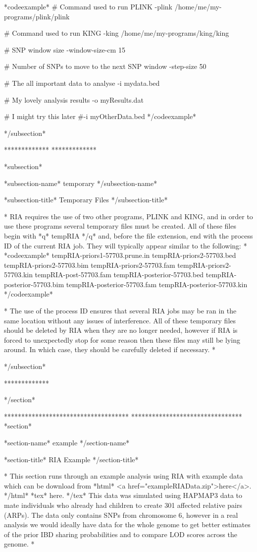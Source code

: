 *codeexample*
# Command used to run PLINK
-plink /home/me/my-programs/plink/plink

# Command used to run KING
-king /home/me/my-programs/king/king

# SNP window size
-window-size-cm 15

# Number of SNPs to move to the next SNP window
-step-size 50

# The all important data to analyse
-i mydata.bed

# My lovely analysis results
-o myResults.dat

# I might try this later
#-i myOtherData.bed
*/codeexample*

*/subsection*

*************
*************

*subsection*

*subsection-name* temporary */subsection-name*

*subsection-title* Temporary Files */subsection-title*


*
RIA requires the use of two other programs, PLINK and KING, and in order to use these programs several temporary files must be created. All of these files begin with *q* tempRIA */q* and, before the file extension, end with the process ID of the current RIA job. They will typically appear similar to the following:
*
*codeexample*
tempRIA-priors1-57703.prune.in
tempRIA-priors2-57703.bed
tempRIA-priors2-57703.bim
tempRIA-priors2-57703.fam
tempRIA-priors2-57703.kin
tempRIA-post-57703.fam
tempRIA-posterior-57703.bed
tempRIA-posterior-57703.bim
tempRIA-posterior-57703.fam
tempRIA-posterior-57703.kin
*/codeexample*

*
The use of the process ID ensures that several RIA jobs may be ran in the same location without any issues of interference. All of these temporary files should be deleted by RIA when they are no longer needed, however if RIA is forced to unexpectedly stop for some reason then these files may still be lying around. In which case, they should be carefully deleted if necessary.
*

*/subsection*

*************

*/section*

************************************
********************************
*section*

*section-name*
example
*/section-name*

*section-title*
RIA Example
*/section-title*

*
This section runs through an example analysis using RIA with example data which can be download from *html* <a href="exampleRIAData.zip">here</a>. */html* *tex* here. */tex* This data was simulated using HAPMAP3 data to mate individuals who already had children to create 301 affected relative pairs (ARPs). The data only contains SNPs from chromosome 6, however in a real analysis we would ideally have data for the whole genome to get better estimates of the prior IBD sharing probabilities and to compare LOD scores across the genome.
*

